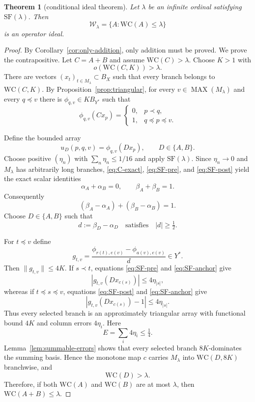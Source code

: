 \documentclass[11pt]{article}
\newtheorem{theorem}{Theorem}[section]
\theoremstyle{definition}
\theoremstyle{remark}
\newcommand{\WC}{\mathrm{WC}}
\newcommand{\MAX}{\operatorname{MAX}}
\newcommand{\cW}{\mathcal W}
\begin{document}
\begin{theorem}[conditional ideal theorem]\label{thm:SF-ideal}
Let $\lambda$ be an infinite ordinal satisfying $\mathrm{SF}(\lambda)$.  Then
\[
   \cW_\lambda=\{A:\WC(A)\leq\lambda\}
\]
is an operator ideal.
\end{theorem}

\begin{proof}
By Corollary~\ref{cor:only-addition}, only addition must be proved.  We prove the contrapositive.  Let $C=A+B$ and assume $\WC(C)>\lambda$.  Choose $K>1$ with
\[
   o(\WC(C,K))>\lambda.
\]
There are vectors $(x_t)_{t\in M_\lambda}\subset B_X$ such that every branch belongs to $\WC(C,K)$.  By Proposition~\ref{prop:triangular}, for every $v\in\MAX(M_\lambda)$ and every $q\preceq v$ there is $\phi_{q,v}\in K B_{Y^*}$ such that
\begin{equation}\label{eq:C-exact}
 \phi_{q,v}(Cx_p)=
 \begin{cases}
 0,&p\prec q,\\
 1,&q\preceq p\preceq v.
 \end{cases}
\end{equation}

Define the bounded array
\[
  u_D(p,q,v)=\phi_{q,v}(Dx_p),
  \qquad D\in\{A,B\}.
\]
Choose positive $(\eta_n)$ with $\sum_n\eta_n\leq1/16$ and apply $\mathrm{SF}(\lambda)$.  Since $\eta_n\to0$ and $M_\lambda$ has arbitrarily long branches, \eqref{eq:C-exact}, \eqref{eq:SF-pre}, and \eqref{eq:SF-post} yield the exact scalar identities
\[
   \alpha_A+\alpha_B=0,
   \qquad
   \beta_A+\beta_B=1.
\]
Consequently
\[
  (\beta_A-\alpha_A)+(\beta_B-\alpha_B)=1.
\]
Choose $D\in\{A,B\}$ such that
\[
   d:=\beta_D-\alpha_D
   \quad\text{satisfies}\quad |d|\geq\tfrac12.
\]

For $t\preceq v$ define
\[
   g_{t,v}
   =\frac{\phi_{r(t),e(v)}-\phi_{a(v),e(v)}}{d}\in Y^*.
\]
Then $\|g_{t,v}\|\leq4K$.  If $s\prec t$, equations \eqref{eq:SF-pre} and \eqref{eq:SF-anchor} give
\[
   |g_{t,v}(Dx_{c(s)})|\leq4\eta_{|s|},
\]
whereas if $t\preceq s\preceq v$, equations \eqref{eq:SF-post} and \eqref{eq:SF-anchor} give
\[
   |g_{t,v}(Dx_{c(s)})-1|\leq4\eta_{|s|}.
\]
Thus every selected branch is an approximately triangular array with functional bound $4K$ and column errors $4\eta_i$.  Here
\[
   E=\sum_i4\eta_i\leq\tfrac14.
\]
Lemma~\ref{lem:summable-errors} shows that every selected branch $8K$-dominates the summing basis.  Hence the monotone map $c$ carries $M_\lambda$ into $\WC(D,8K)$ branchwise, and
\[
   \WC(D)>\lambda.
\]
Therefore, if both $\WC(A)$ and $\WC(B)$ are at most $\lambda$, then $\WC(A+B)\leq\lambda$.
\end{proof}
\end{document}
